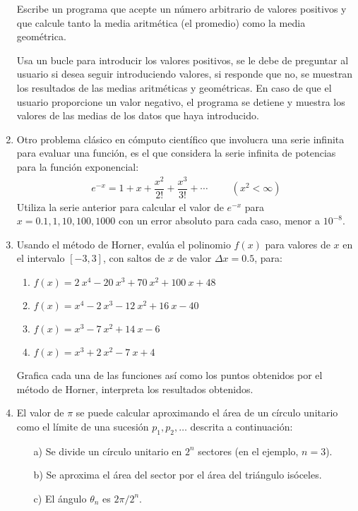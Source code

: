 \begin{enumerate}
Escribe un programa que acepte un número arbitrario de valores positivos y que calcule tanto la media aritmética (el promedio) como la media geométrica.
\par
Usa un bucle para introducir los valores positivos, se le debe de preguntar al usuario si desea seguir introduciendo valores, si responde que no, se muestran los resultados de las medias aritméticas y geométricas. En caso de que el usuario proporcione un valor negativo, el programa se detiene y muestra los valores de las medias de los datos que haya introducido.
\item Otro problema clásico en cómputo científico que involucra una serie infinita para evaluar una función, es el que considera la serie infinita de potencias para la función exponencial:
\begin{align*}
e^{-x} = 1 + x + \dfrac{x^{2}}{2!} + \dfrac{x^{3}}{3!} +\cdots \hspace{1cm} (x^{2} < \infty)
\end{align*}
Utiliza la serie anterior para calcular el valor de $e^{-x}$ para $x = 0.1, 1, 10, 100, 1000$ con un error absoluto para cada caso, menor a $10^{-8}$.
\item Usando el método de Horner, evalúa el polinomio $f (x)$ para valores de $x$ en el intervalo $[-3, 3]$, con saltos de $x$ de valor $\Delta x = 0.5$, para:
\begin{enumerate}
\item $f (x) = 2 \: x^{4} - 20\: x^{3} + 70 \: x^{2} + 100 \: x + 48$
\item $f (x) = x^{4} - 2 \: x^{3} - 12 \: x^{2} + 16 \: x - 40$
\item $f (x) = x^{3} - 7 \: x^{2} + 14 \: x - 6$
\item $f (x) = x^{3} + 2 \: x^{2} -  7 \: x + 4$
\end{enumerate}
Grafica cada una de las funciones así como los puntos obtenidos por el método de Horner, interpreta los resultados obtenidos.
\item \label{problema_08} El valor de $\pi$ se puede calcular aproximando el área de un círculo unitario como el límite de una sucesión $p_{1}, p_{2}, \ldots$ descrita a continuación:
\begin{enumerate}
\item[a)] Se divide un círculo unitario en $2^{n}$ sectores (en el ejemplo, $n = 3$).
\item[b)] Se aproxima el área del sector por el área del triángulo isóceles.
\item[c)] El ángulo $\theta_{n}$ es $2 \pi / 2^{n}$.

\end{enumerate}
\end{enumerate}
